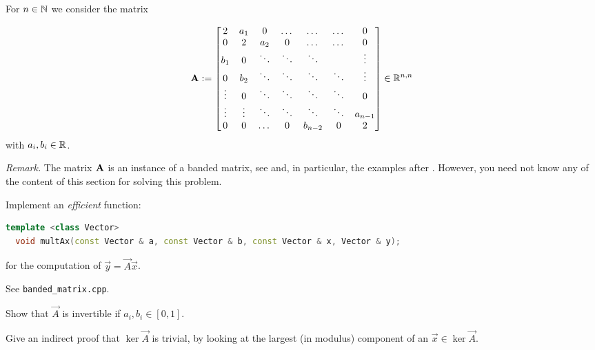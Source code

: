 \renewcommand{\chpt}{ch_directmethodslse}

\begin{problem} \label{prb:efficientbandmult}
  For $n\in\mathbb{N}$ we consider the matrix

 \begingroup
\renewcommand*{\arraystretch}{1.5}
 \begin{align*}
  \mathbf{A} := \begin{bmatrix}
              2 & a_1 & 0 & \dots & \dots & \dots & 0 \\
              0 & 2 & a_2 & 0 & \dots & \dots & 0 \\
              b_1 & 0 & \ddots & \ddots & \ddots & & \vdots \\
              0 & b_2 & \ddots & \ddots & \ddots & \ddots & \vdots \\
              \vdots & 0 & \ddots & \ddots & \ddots & \ddots & 0 \\
              \vdots & \vdots  & \ddots & \ddots & \ddots & \ddots & a_{n-1} \\
              0 & 0 & \dots & 0 & b_{n-2} & 0 & 2 \\
             \end{bmatrix} \in \mathbb{R}^{n,n}
 \end{align*}
 \endgroup
 with $a_i, b_i \in \mathbb{R}$. 

\emph{Remark.} The matrix ${\mathbf{A}}$ is an instance of a banded matrix, see
 and, in particular, the examples after 
. However, you need not know any of the content of this
section for solving this problem.
 
\begin{subproblem}[2]
 Implement an \emph{efficient} \Cpp{} function:
 \begin{lstlisting}[language=c++]
  template <class Vector>
  void multAx(const Vector & a, const Vector & b, const Vector & x, Vector & y);
 \end{lstlisting}
 for the computation of $\vec{y} = \vec{A} \vec{x}$.
 
 \begin{solution}
  See \texttt{banded\_matrix.cpp}.
 \end{solution}
\end{subproblem}

\begin{subproblem}[4]\label{ebmm:sp3}
 Show that $\vec{A}$ is invertible if $a_i, b_i \in [0,1]$.
 
 \begin{hint}
   Give an indirect proof that $\ker \vec{A}$ is trivial, by looking at the
   largest (in modulus) component of an $\vec{x} \in \ker \vec{A}$.
 \end{hint}
 

\end{subproblem}
\end{problem}

